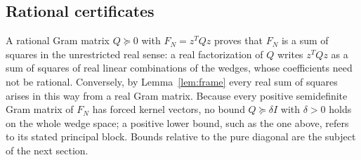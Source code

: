 \subsection{Rational certificates}
A rational Gram matrix $Q\succeq0$ with $F_N=z^TQz$ proves that $F_N$ is
a sum of squares in the unrestricted real sense: a real factorization
of $Q$ writes $z^TQz$ as a sum of squares of real linear combinations
of the wedges, whose coefficients need not be rational. Conversely, by
Lemma~\ref{lem:frame} every real sum of squares arises in this way from
a real Gram matrix. Because every positive semidefinite Gram matrix of
$F_N$ has forced kernel vectors, no bound $Q\succeq\delta I$ with
$\delta>0$ holds on the whole wedge space; a positive lower bound, such
as the one above, refers to its stated principal block. Bounds relative
to the pure diagonal are the subject of the next section.
